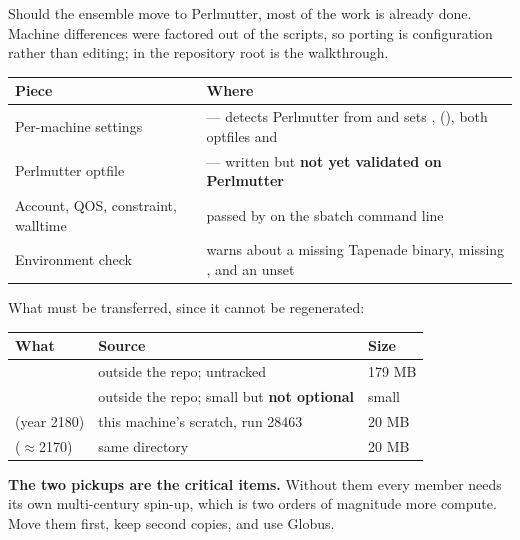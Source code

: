 Should the ensemble move to Perlmutter, most of the work is already done. Machine
differences were factored out of the scripts, so porting is configuration rather
than editing;  in the repository root is the walkthrough.

\begin{center}
\begin{tabularx}{\textwidth}{@{}Y{0.6}Y{1.4}@{}}
\toprule
\textbf{Piece} & \textbf{Where}\\
\midrule
Per-machine settings &  --- detects Perlmutter from
   and sets , 
  (), both optfiles and \\
Perlmutter optfile &  --- written but \textbf{not yet validated on Perlmutter}\\
Account, QOS, constraint, walltime & passed by  on the
  sbatch command line\\
Environment check &  warns about a missing Tapenade
  binary, missing , and an unset \\
\bottomrule
\end{tabularx}
\end{center}

What must be transferred, since it cannot be regenerated:

\begin{center}
\begin{tabularx}{\textwidth}{@{}Y{1.15}Y{1.55}Y{0.3}@{}}
\toprule
\textbf{What} & \textbf{Source} & \textbf{Size}\\
\midrule
{} & outside the repo; untracked & 179 MB\\
 & outside the repo; small but
  \textbf{not optional} & small\\
 (year 2180) & this machine's scratch, run
  28463 & 20 MB\\
 ($\approx$2170) & same directory & 20 MB\\
\bottomrule
\end{tabularx}
\end{center}

\textbf{The two pickups are the critical items.} Without them every member needs
its own multi-century spin-up, which is two orders of magnitude more compute.
Move them first, keep second copies, and use Globus.

